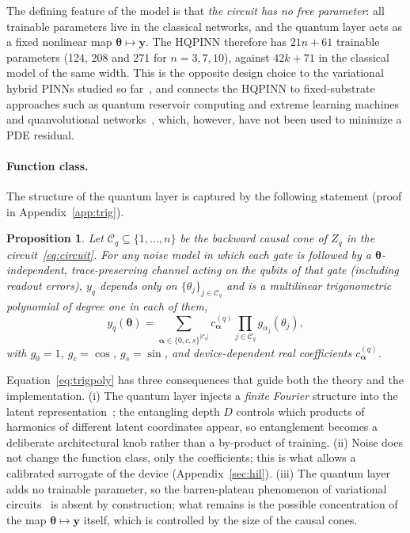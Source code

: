 \documentclass[floatfix,aps,pra,twocolumn,showpacs,superscriptaddress,10pt,nofootinbib]{revtex4-2}
\newtheorem{proposition}{Proposition}
\begin{document}
The defining feature of the model is that \emph{the circuit has no free parameter}: all trainable parameters live in the classical networks, and the quantum layer acts as a fixed nonlinear map $\bm\theta\mapsto\bm y$. The HQPINN therefore has $21n+61$ trainable parameters (124, 208 and 271 for $n=3,7,10$), against $42k+71$ in the classical model of the same width. This is the opposite design choice to the variational hybrid PINNs studied so far~\cite{farea2025qcpinn,berger2025trainable,sedykh2024hybrid}, and connects the HQPINN to fixed-substrate approaches such as quantum reservoir computing and extreme learning machines~\cite{mujal2021opportunities} and quanvolutional networks~\cite{henderson2020quanvolutional}, which, however, have not been used to minimize a PDE residual.

\paragraph{Function class.} The structure of the quantum layer is captured by the following statement (proof in Appendix~\ref{app:trig}).
\begin{proposition}\label{prop:trig}
Let $\mathcal C_q\subseteq\{1,\dots,n\}$ be the backward causal cone of $Z_q$ in the circuit~\eqref{eq:circuit}. For any noise model in which each gate is followed by a $\bm\theta$-independent, trace-preserving channel acting on the qubits of that gate (including readout errors), $y_q$ depends only on $\{\theta_j\}_{j\in\mathcal C_q}$ and is a multilinear trigonometric polynomial of degree one in each of them,
\begin{equation}
  y_q(\bm\theta)=\sum_{\bm\alpha\in\{0,c,s\}^{|\mathcal C_q|}}c^{(q)}_{\bm\alpha}\prod_{j\in\mathcal C_q}g_{\alpha_j}(\theta_j),
  \label{eq:trigpoly}
\end{equation}
with $g_0=1$, $g_c=\cos$, $g_s=\sin$, and device-dependent real coefficients $c^{(q)}_{\bm\alpha}$.
\end{proposition}
Equation~\eqref{eq:trigpoly} has three consequences that guide both the theory and the implementation. (i) The quantum layer injects a \emph{finite Fourier} structure into the latent representation~\cite{schuld2021effect}; the entangling depth $D$ controls which products of harmonics of different latent coordinates appear, so entanglement becomes a deliberate architectural knob rather than a by-product of training. (ii) Noise does not change the function class, only the coefficients; this is what allows a calibrated surrogate of the device (Appendix~\ref{sec:hil}). (iii) The quantum layer adds no trainable parameter, so the barren-plateau phenomenon of variational circuits~\cite{mcclean2018barren,cerezo2021cost,holmes2022connecting,ortizmarrero2021entanglement} is absent by construction; what remains is the possible concentration of the map $\bm\theta\mapsto\bm y$ itself, which is controlled by the size of the causal cones.
\end{document}
